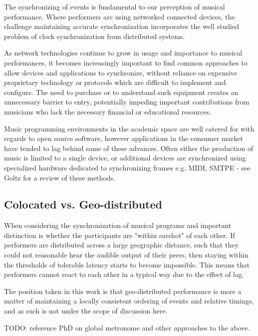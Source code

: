 \documentclass[11pt]{article} %
\theoremstyle{plain}
\theoremstyle{definition}
\begin{document}

The synchronizing of events is fundamental to our perception of musical
performance. Where performers are using networked connected devices, the
challenge maintaining accurate synchronization incorporates the well studied
problem of clock synchronization from distributed systems.

As network technologies continue to grow in usage and importance to musical
performances\cite{madgwick2015simple}, it becomes increasingly important to
find common approaches to allow devices and applications to synchronize, without
reliance on expensive proprietary technology or protocols which are difficult to
implement and configure. The need to purchase or to understand such equipment
creates an unnecessary barrier to entry, potentially impeding important
contributions from musicians who lack the necessary financial or educational
resources.

Music programming environments in the academic space are well catered for with
regards to open source software, however applications in the consumer market
have tended to lag behind some of these advances. Often either the production
of music is limited to a single device, or additional devices are synchronized
using specialized hardware dedicated to synchronizing frames e.g. MIDI, SMTPE -
see Goltz\cite{goltz2018ableton} for a review of these methods.

\subsection{Colocated vs. Geo-distributed}

When considering the synchronization of musical programs and important
distinction is whether the participants are "within earshot" of each other. If
performers are distributed across a large geographic distance, such that they
could not reasonable hear the audible output of their peers, then staying
within the thresholds of tolerable latency starts to become impossible. This
means that performers cannot react to each other in a typical way due to the
effect of lag.

The position taken in this work is that geo-distributed performance is more a
matter of maintaining a locally consistent ordering of events and relative
timings, and as such is not under the scope of discussion here.

TODO: reference PhD on global metronome and other approaches to the above.
\end{document}
